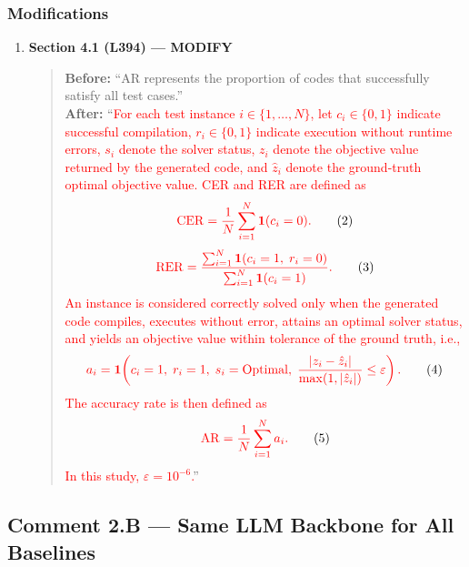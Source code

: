 \documentclass[11pt,a4paper]{article}
\begin{document}
\subsubsection{Modifications}
\begin{enumerate}
\item \textbf{Section 4.1 (L394) --- MODIFY}
\begin{quote}
\textbf{Before:} ``AR represents the proportion of codes that successfully satisfy all test cases.''\\[4pt]
\textbf{After:} ``\textcolor{red}{For each test instance $i \in \{1,\dots,N\}$, let $c_i \in \{0,1\}$ indicate successful compilation, $r_i \in \{0,1\}$ indicate execution without runtime errors, $s_i$ denote the solver status, $z_i$ denote the objective value returned by the generated code, and $\hat z_i$ denote the ground-truth optimal objective value. CER and RER are defined as}
\begin{equation}
\textcolor{red}{\mathrm{CER}=\frac{1}{N}\sum_{i=1}^{N}\mathbf{1}(c_i=0).} \tag{2}
\end{equation}
\begin{equation}
\textcolor{red}{\mathrm{RER}=\frac{\sum_{i=1}^{N}\mathbf{1}(c_i=1,\; r_i=0)}{\sum_{i=1}^{N}\mathbf{1}(c_i=1)}.} \tag{3}
\end{equation}
\textcolor{red}{An instance is considered correctly solved only when the generated code compiles, executes without error, attains an optimal solver status, and yields an objective value within tolerance of the ground truth, i.e.,}
\begin{equation}
\textcolor{red}{a_i=\mathbf{1}\!\left(c_i=1,\; r_i=1,\; s_i=\mathrm{Optimal},\; \frac{|z_i-\hat z_i|}{\max(1,|\hat z_i|)}\le \varepsilon\right).} \tag{4}
\end{equation}
\textcolor{red}{The accuracy rate is then defined as}
\begin{equation}
\textcolor{red}{\mathrm{AR}=\frac{1}{N}\sum_{i=1}^{N} a_i.} \tag{5}
\end{equation}
\textcolor{red}{In this study, $\varepsilon = 10^{-6}$.}''
\end{quote}
\end{enumerate}

\subsection{Comment 2.B --- Same LLM Backbone for All Baselines}
\end{document}
